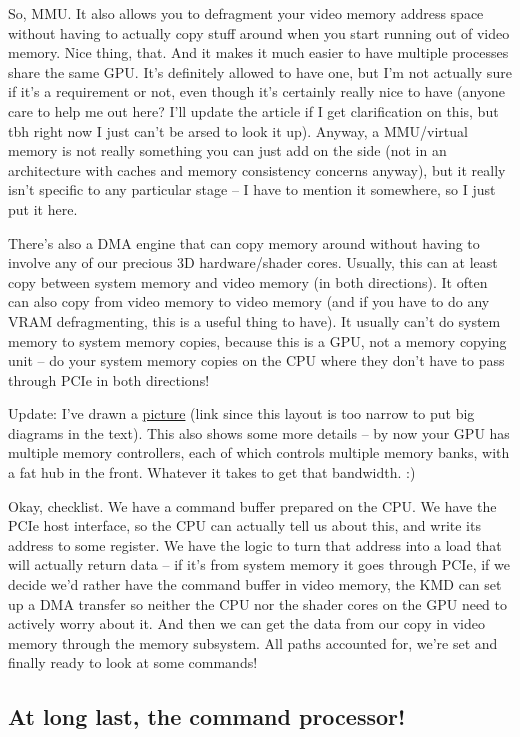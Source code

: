 \documentclass[12pt]{article}
\begin{document}
So, MMU. It also allows you to defragment your video memory address space without having to actually copy stuff around when you start running out of video memory. Nice thing, that. And it makes it much easier to have multiple processes share the same GPU. It’s definitely allowed to have one, but I’m not actually sure if it’s a requirement or not, even though it’s certainly really nice to have (anyone care to help me out here? I’ll update the article if I get clarification on this, but tbh right now I just can’t be arsed to look it up). Anyway, a MMU/virtual memory is not really something you can just add on the side (not in an architecture with caches and memory consistency concerns anyway), but it really isn’t specific to any particular stage – I have to mention it somewhere, so I just put it here.

There’s also a DMA engine that can copy memory around without having to involve any of our precious 3D hardware/shader cores. Usually, this can at least copy between system memory and video memory (in both directions). It often can also copy from video memory to video memory (and if you have to do any VRAM defragmenting, this is a useful thing to have). It usually can’t do system memory to system memory copies, because this is a GPU, not a memory copying unit – do your system memory copies on the CPU where they don’t have to pass through PCIe in both directions!

Update: I’ve drawn a \href{http://www.farbrausch.de/\~fg/gpu/gpu\_memory.jpg}{picture} (link since this layout is too narrow to put big diagrams in the text). This also shows some more details – by now your GPU has multiple memory controllers, each of which controls multiple memory banks, with a fat hub in the front. Whatever it takes to get that bandwidth. :)

Okay, checklist. We have a command buffer prepared on the CPU. We have the PCIe host interface, so the CPU can actually tell us about this, and write its address to some register. We have the logic to turn that address into a load that will actually return data – if it’s from system memory it goes through PCIe, if we decide we’d rather have the command buffer in video memory, the KMD can set up a DMA transfer so neither the CPU nor the shader cores on the GPU need to actively worry about it. And then we can get the data from our copy in video memory through the memory subsystem. All paths accounted for, we’re set and finally ready to look at some commands!

\subsection{At long last, the command processor!}
\label{sec:org10c2938}
\end{document}

